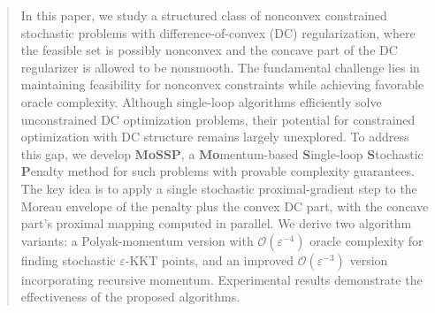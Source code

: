 \documentclass{article}
\theoremstyle{plain}
\theoremstyle{definition}
\theoremstyle{remark}
\newcommand{\calO}{\mathcal{O}}
\numberwithin{equation}{section}
\begin{document}



\printAffiliationsAndNotice{}
\begin{abstract}
In this paper, we study a structured class of nonconvex constrained stochastic problems with difference-of-convex (DC) regularization, where the feasible set is possibly nonconvex and the concave part of the DC regularizer is allowed to be nonsmooth.
The fundamental challenge lies in maintaining feasibility for nonconvex constraints while achieving favorable oracle complexity.
Although single-loop algorithms efficiently solve unconstrained DC optimization problems, their potential for constrained optimization with DC structure remains largely unexplored. To address this gap, we develop \textbf{MoSSP}, a \textbf{Mo}mentum-based \textbf{S}ingle-loop \textbf{S}tochastic \textbf{P}enalty method for such problems with provable complexity guarantees. The key idea is to apply a single stochastic proximal-gradient step to the Moreau envelope of the penalty plus the convex DC part, with the concave part's proximal mapping computed in parallel. We derive two algorithm variants: a Polyak-momentum version with $\calO(\varepsilon^{-4})$ oracle complexity for finding stochastic $\varepsilon$-KKT points, and an improved $\calO(\varepsilon^{-3})$ version incorporating recursive momentum. Experimental results demonstrate the effectiveness of the proposed algorithms.
\end{abstract}
\end{document}
